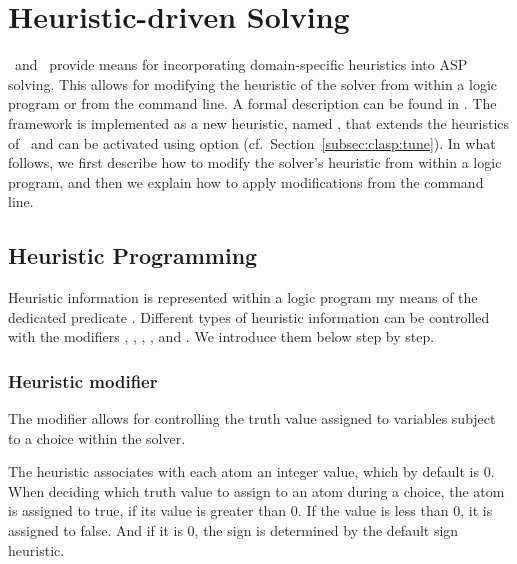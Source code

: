 
\section{Heuristic-driven Solving}
\label{sec:heuristic}

\clasp\ and \clingo\ provide means for incorporating domain-specific heuristics into ASP solving.
This allows for modifying the heuristic of the solver from within a logic program or from the command line.
A formal description can be found in \cite{gekaotroscwa13a}.
The framework is implemented as a new heuristic, named ,
that extends the  heuristics of \clasp\ 
and can be activated using option 
(cf.\ Section~\ref{subsec:clasp:tune}).
In what follows,
we first describe how to modify the solver's heuristic from within a logic program, 
and then we explain how to apply modifications from the command line.

\subsection{Heuristic Programming}

Heuristic information is represented within a logic program my means of the dedicated predicate .
Different types of heuristic information can be controlled with the modifiers 
\code{sign}, \code{level}, \code{true}, \code{false}, \code{init} and .
We introduce them below step by step.

\subsubsection{Heuristic modifier }

The modifier  allows for controlling the truth value assigned to variables subject to a choice within the solver.

The  heuristic associates with each atom an integer  value, which by default is $0$.
When deciding which truth value to assign to an atom during a choice, the atom is assigned to true, if its  value is greater than $0$. 
If the \code{sign} value is less than 0, it is assigned to false.
And if it is $0$, the sign is determined by the default sign heuristic.

